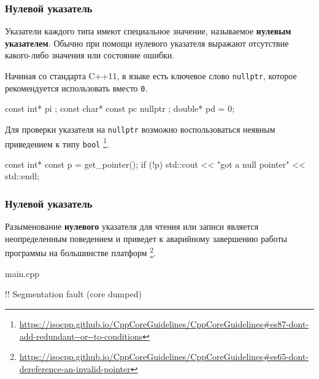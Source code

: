 \documentclass[compress, 8pt, aspectratio=169]{beamer}
\begin{document}
\begin{frame}[fragile]

    \frametitle{Нулевой указатель}

    \hfill \break

    Указатели каждого типа имеют специальное значение, называемое
    \textbf{нулевым указателем}.
    Обычно при помощи нулевого указателя выражают отсутствие какого-либо
    значения или состояние ошибки.

    Начиная со стандарта C++11, в языке есть ключевое слово \verb|nullptr|,
    которое рекомендуется\footnotemark{} использовать вместо \verb|0|.


    \begin{myinplacelisting}[minted language=cpp]
const int* pi {};
const char* const pc { nullptr };
double* pd = 0;
    \end{myinplacelisting}

    Для проверки указателя на \verb|nullptr| возможно воспользоваться
    неявным приведением к типу \verb|bool|
    \footnote{\url{https://isocpp.github.io/CppCoreGuidelines/CppCoreGuidelines\#es87-dont-add-redundant--or--to-conditions}}.

    \begin{myinplacelisting}[minted language=cpp]
const int* const p = get_pointer();
if (!p) {
    std::cout << "got a null pointer" << std::endl;
}
    \end{myinplacelisting}

\end{frame}

\begin{frame}[fragile]

    \frametitle{Нулевой указатель}

    Разыменование \textbf{нулевого} указателя для чтения или записи является
    неопределенным поведением и приведет к аварийному завершению работы
    программы на большинстве платформ
    \footnote{\url{https://isocpp.github.io/CppCoreGuidelines/CppCoreGuidelines\#es65-dont-dereference-an-invalid-pointer}}.

        {main.cpp}

    \begin{terminalwindow}
!!
Segmentation fault (core dumped)
    \end{terminalwindow}

\end{frame}
\end{document}
